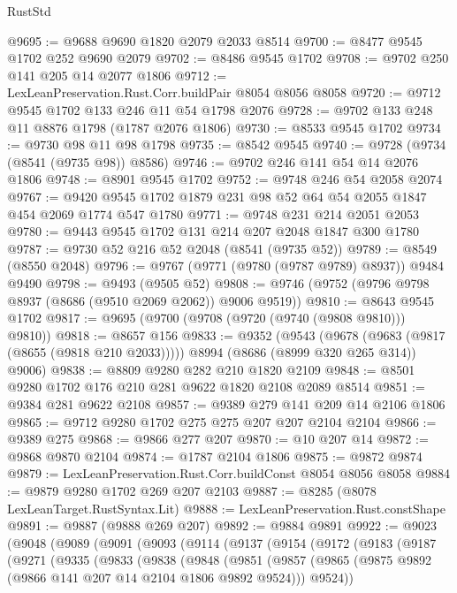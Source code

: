 \begin{lexlean}{RustStd}
\begin{coremodule}
@9695 := @9688 @9690 @1820 @2079 @2033 @8514
@9700 := @8477 @9545 @1702 @252 @9690 @2079
@9702 := @8486 @9545 @1702
@9708 := @9702 @250 @141 @205 @14 @2077 @1806
@9712 := LexLeanPreservation.Rust.Corr.buildPair @8054 @8056 @8058
@9720 := @9712 @9545 @1702 @133 @246 @11 @54 @1798 @2076
@9728 := @9702 @133 @248 @11 @8876 @1798 (@1787 @2076 @1806)
@9730 := @8533 @9545 @1702
@9734 := @9730 @98 @11 @98 @1798
@9735 := @8542 @9545
@9740 := @9728 (@9734 (@8541 (@9735 @98)) @8586)
@9746 := @9702 @246 @141 @54 @14 @2076 @1806
@9748 := @8901 @9545 @1702
@9752 := @9748 @246 @54 @2058 @2074
@9767 := @9420 @9545 @1702 @1879 @231 @98 @52 @64 @54 @2055 @1847 @454 @2069 @1774 @547 @1780
@9771 := @9748 @231 @214 @2051 @2053
@9780 := @9443 @9545 @1702 @131 @214 @207 @2048 @1847 @300 @1780
@9787 := @9730 @52 @216 @52 @2048 (@8541 (@9735 @52))
@9789 := @8549 (@8550 @2048)
@9796 := @9767 (@9771 (@9780 (@9787 @9789) @8937)) @9484 @9490
@9798 := @9493 (@9505 @52)
@9808 := @9746 (@9752 (@9796 @9798 @8937 (@8686 (@9510 @2069 @2062)) @9006 @9519))
@9810 := @8643 @9545 @1702
@9817 := @9695 (@9700 (@9708 (@9720 (@9740 (@9808 @9810))) @9810))
@9818 := @8657 @156
@9833 := @9352
    (@9543
      (@9678 (@9683 (@9817 (@8655 (@9818 @210 @2033)))))
      @8994
      (@8686 (@8999 @320 @265 @314))
      @9006)
@9838 := @8809 @9280 @282 @210 @1820 @2109
@9848 := @8501 @9280 @1702 @176 @210 @281 @9622 @1820 @2108 @2089 @8514
@9851 := @9384 @281 @9622 @2108
@9857 := @9389 @279 @141 @209 @14 @2106 @1806
@9865 := @9712 @9280 @1702 @275 @275 @207 @207 @2104 @2104
@9866 := @9389 @275
@9868 := @9866 @277 @207
@9870 := @10 @207 @14
@9872 := @9868 @9870 @2104
@9874 := @1787 @2104 @1806
@9875 := @9872 @9874
@9879 := LexLeanPreservation.Rust.Corr.buildConst @8054 @8056 @8058
@9884 := @9879 @9280 @1702 @269 @207 @2103
@9887 := @8285 (@8078 LexLeanTarget.RustSyntax.Lit)
@9888 := LexLeanPreservation.Rust.constShape
@9891 := @9887 (@9888 @269 @207)
@9892 := @9884 @9891
@9922 := @9023
    (@9048
      (@9089
        (@9091
          (@9093
            (@9114
              (@9137
                (@9154
                  (@9172
                    (@9183
                      (@9187
                        (@9271
                          (@9335
                            (@9833
                              (@9838
                                (@9848
                                  (@9851
                                    (@9857
                                      (@9865
                                        (@9875 @9892 (@9866 @141 @207 @14 @2104 @1806 @9892 @9524)))
                                      @9524))

\end{coremodule}
\end{lexlean}
